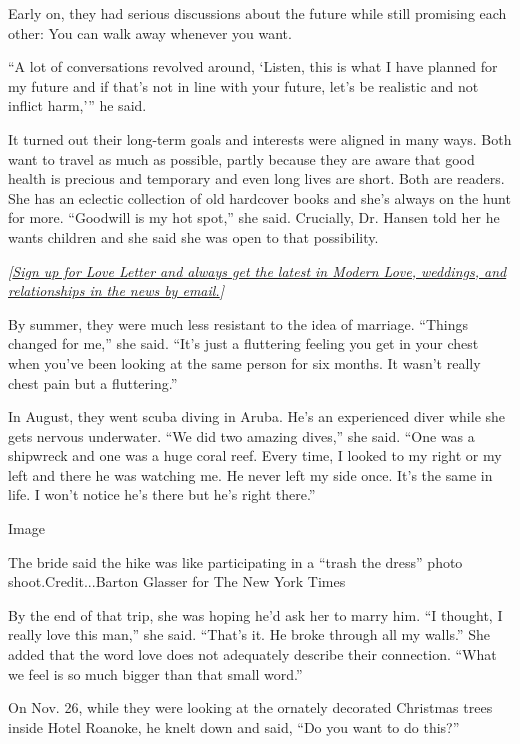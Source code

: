 Early on, they had serious discussions about the future while still
promising each other: You can walk away whenever you want.

``A lot of conversations revolved around, `Listen, this is what I have
planned for my future and if that's not in line with your future, let's
be realistic and not inflict harm,''' he said.

It turned out their long-term goals and interests were aligned in many
ways. Both want to travel as much as possible, partly because they are
aware that good health is precious and temporary and even long lives are
short. Both are readers. She has an eclectic collection of old hardcover
books and she's always on the hunt for more. ``Goodwill is my hot
spot,'' she said. Crucially, Dr. Hansen told her he wants children and
she said she was open to that possibility.

\emph{{[}}\href{https://www.nytimes3xbfgragh.onion/newsletters/love-letter?module=inline}{\emph{Sign
up for Love Letter and always get the latest in Modern Love, weddings,
and relationships in the news by email.}}\emph{{]}}

By summer, they were much less resistant to the idea of marriage.
``Things changed for me,'' she said. ``It's just a fluttering feeling
you get in your chest when you've been looking at the same person for
six months. It wasn't really chest pain but a fluttering.''

In August, they went scuba diving in Aruba. He's an experienced diver
while she gets nervous underwater. ``We did two amazing dives,'' she
said. ``One was a shipwreck and one was a huge coral reef. Every time, I
looked to my right or my left and there he was watching me. He never
left my side once. It's the same in life. I won't notice he's there but
he's right there.''

Image

The bride said the hike was like participating in a ``trash the dress''
photo shoot.Credit...Barton Glasser for The New York Times

By the end of that trip, she was hoping he'd ask her to marry him. ``I
thought, I really love this man,'' she said. ``That's it. He broke
through all my walls.'' She added that the word love does not adequately
describe their connection. ``What we feel is so much bigger than that
small word.''

On Nov. 26, while they were looking at the ornately decorated Christmas
trees inside Hotel Roanoke, he knelt down and said, ``Do you want to do
this?''

